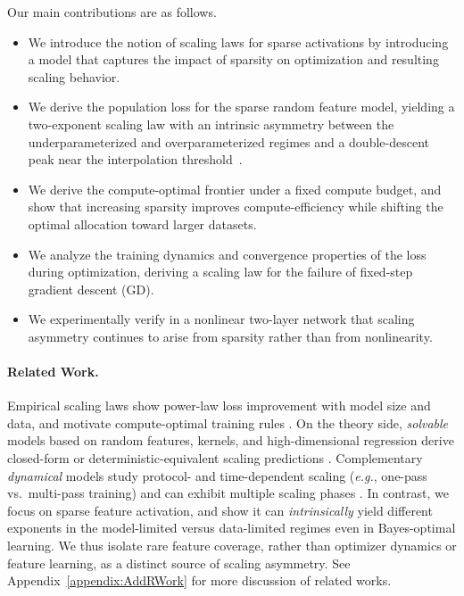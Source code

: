 \documentclass[11pt]{article}
\theoremstyle{plain}
\theoremstyle{definition}
\theoremstyle{remark}
\newcommand{\JSCheck}[1]{#1}
\begin{document}
Our main contributions are as follows.
\begin{itemize}[leftmargin=*,nosep]
    \item We introduce the notion of scaling laws for sparse activations by introducing a model that captures the impact of sparsity on optimization and resulting scaling behavior.

    \item We derive the \JSCheck{population loss} for the sparse random feature model, yielding a two-exponent scaling law with an intrinsic asymmetry between the underparameterized and overparameterized regimes and a double-descent peak near the interpolation threshold~\citep{geiger2019jamming,belkin2019reconciling,belkin2020twomodels,hastie2022surprises,bartlett2020benign,mei2022rf,nakkiran2020deep}.

    \item We derive the compute-optimal frontier under a fixed compute budget, and show that increasing sparsity improves compute-efficiency  while shifting the optimal allocation toward larger datasets.

    
    \item We analyze the training dynamics and convergence properties of the loss during optimization, deriving a scaling law for the failure of fixed-step gradient descent (GD).

    \item \JSCheck{We experimentally verify in a  nonlinear two-layer network that scaling asymmetry continues to arise from sparsity rather than from nonlinearity.}
\end{itemize}

\vspace{-2mm}


\paragraph{Related Work.} Empirical scaling laws show power-law loss improvement with model size and data, and motivate compute-optimal training rules \citep{Kaplan2020ScalingLaws,Hoffmann2022Chinchilla}. On the theory side, \emph{solvable} models based on random features, kernels, and high-dimensional regression derive closed-form or deterministic-equivalent scaling predictions \citep{Bahri2021ExplainingScaling, Maloney2022SolvableScaling,pmlr-v119-bordelon20a,Spigler_2020, Defilippis2024DimensionFreeDE,Lin2024LinRegScaling}. Complementary \emph{dynamical} models study protocol- and time-dependent scaling (\textit{e.g.}, one-pass vs.\ multi-pass training) and can exhibit multiple scaling phases \citep{Bordelon2024DynamicalScaling, Paquette2024Phases, bordelon2025featurelearning}. In contrast, we focus on sparse feature activation, and show it can \emph{intrinsically} yield different exponents in the model-limited versus data-limited regimes even in Bayes-optimal learning. \JSCheck{We thus isolate rare feature coverage, rather than optimizer dynamics or feature learning, as a distinct source of scaling asymmetry.} See Appendix~\ref{appendix:AddRWork} for more discussion of related works.
\end{document}
